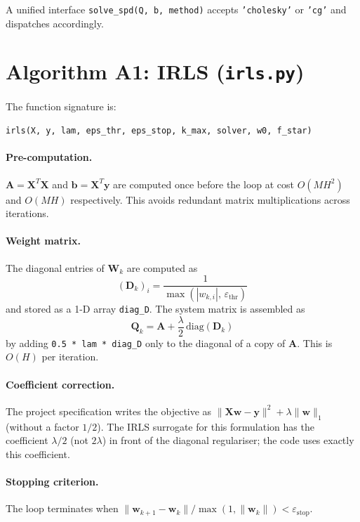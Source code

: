 A unified interface \texttt{solve\_spd(Q, b, method)} accepts \texttt{'cholesky'}
or \texttt{'cg'} and dispatches accordingly.

\section{Algorithm A1: IRLS (\texttt{irls.py})}
\label{sec:impl_irls}

The function signature is:
\begin{center}
\texttt{irls(X, y, lam, eps\_thr, eps\_stop, k\_max, solver, w0, f\_star)}
\end{center}

\paragraph{Pre-computation.}
$\mathbf{A} = \mathbf{X}^T\mathbf{X}$ and $\mathbf{b} = \mathbf{X}^T\mathbf{y}$
are computed once before the loop at cost $O(MH^2)$ and $O(MH)$ respectively.
This avoids redundant matrix multiplications across iterations.

\paragraph{Weight matrix.}
The diagonal entries of $\mathbf{W}_k$ are computed as
\[
    (\mathbf{D}_k)_i = \frac{1}{\max(|w_{k,i}|,\,\varepsilon_{\mathrm{thr}})}
\]
and stored as a 1-D array \texttt{diag\_D}. The system matrix is assembled as
\[
    \mathbf{Q}_k = \mathbf{A} + \frac{\lambda}{2}\,\mathrm{diag}(\mathbf{D}_k)
\]
by adding \texttt{0.5 * lam * diag\_D} only to the diagonal of a copy of $\mathbf{A}$.
This is $O(H)$ per iteration.

\paragraph{Coefficient correction.}
The project specification writes the objective as $\|\mathbf{Xw}-\mathbf{y}\|^2 +
\lambda\|\mathbf{w}\|_1$ (without a factor $1/2$). The IRLS surrogate for
this formulation has the coefficient $\lambda/2$ (not $2\lambda$) in front of the
diagonal regulariser; the code uses exactly this coefficient.

\paragraph{Stopping criterion.}
The loop terminates when
$\|\mathbf{w}_{k+1}-\mathbf{w}_k\| / \max(1, \|\mathbf{w}_k\|) < \varepsilon_{\mathrm{stop}}$.

